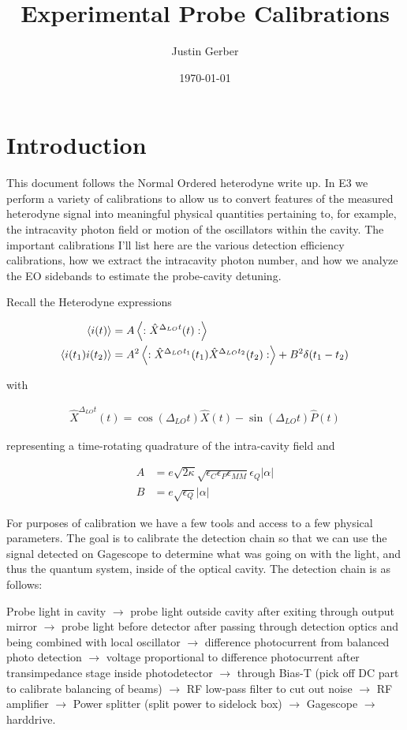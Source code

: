 \documentclass[12pt]{article}
\begin{document}
\title{Experimental Probe Calibrations}
\author{Justin Gerber}
\date{\today}
\maketitle

\section{Introduction}

This document follows the Normal Ordered heterodyne write up. In E3 we perform a variety of calibrations to allow us to convert features of the measured heterodyne signal into meaningful physical quantities pertaining to, for example, the intracavity photon field or motion of the oscillators within the cavity. The important calibrations I'll list here are the various detection efficiency calibrations, how we extract the intracavity photon number, and how we analyze the EO sidebands to estimate the probe-cavity detuning.

Recall the Heterodyne expressions

\begin{align}
\Braket{i(t)} &= A\left<:\hat{X}^{\Delta_{LO} t}(t):\right>\\
\Braket{i(t_1)i(t_2)} &= A^2 \left<:\hat{X}^{\Delta_{LO}t_1}(t_1)\hat{X}^{\Delta_{LO}t_2}(t_2):\right> + B^2 \delta(t_1-t_2)
\end{align}

with 

\begin{align}
\hat{X}^{\Delta_{LO} t}(t) = \cos(\Delta_{LO}t) \hat{X}(t) - \sin(\Delta_{LO}t)\hat{P}(t)
\end{align}

representing a time-rotating quadrature of the intra-cavity field and

\begin{align}
A &= e \sqrt{2\kappa}\sqrt{\epsilon_C \epsilon_P \epsilon_{MM}} \epsilon_Q |\alpha|\\
B &= e \sqrt{\epsilon_Q} |\alpha|
\end{align}

For purposes of calibration we have a few tools and access to a few physical parameters. The goal is to calibrate the detection chain so that we can use the signal detected on Gagescope to determine what was going on with the light, and thus the quantum system, inside of the optical cavity. The detection chain is as follows:

Probe light in cavity $\rightarrow$ probe light outside cavity after exiting through output mirror $\rightarrow$ probe light before detector after passing through detection optics and being combined with local oscillator $\rightarrow$ difference photocurrent from balanced photo detection $\rightarrow$ voltage proportional to difference photocurrent after transimpedance stage inside photodetector $\rightarrow$ through Bias-T (pick off DC part to calibrate balancing of beams) $\rightarrow$ RF low-pass filter to cut out noise $\rightarrow$ RF amplifier $\rightarrow$ Power splitter (split power to sidelock box) $\rightarrow$ Gagescope $\rightarrow$ harddrive.
\end{document}
